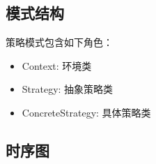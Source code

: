 \documentclass[letterpaper,10pt,english]{sphinxmanual}
\begin{document}
\subsection{模式结构}
\label{\detokenize{behavioral_patterns/strategy:id5}}
\sphinxAtStartPar
策略模式包含如下角色：
\begin{itemize}
\item {} 
\sphinxAtStartPar
Context: 环境类

\item {} 
\sphinxAtStartPar
Strategy: 抽象策略类

\item {} 
\sphinxAtStartPar
ConcreteStrategy: 具体策略类

\end{itemize}

\noindent{}


\subsection{时序图}
\label{\detokenize{behavioral_patterns/strategy:id6}}
\noindent{}
\end{document}
